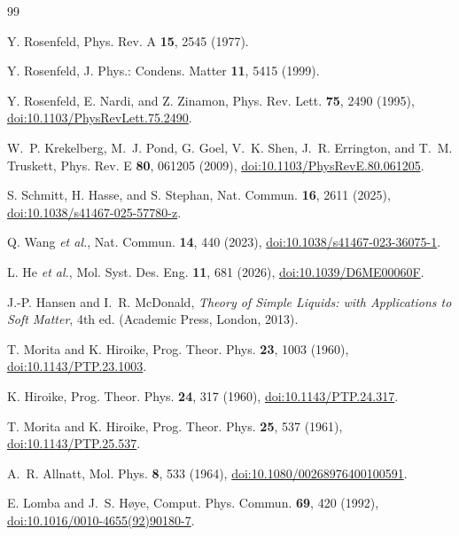 \documentclass[aps,pre,twocolumn,superscriptaddress,floatfix]{revtex4-2}
\begin{document}
\begin{thebibliography}{99}

Y. Rosenfeld,
Phys. Rev. A \textbf{15}, 2545 (1977).

Y. Rosenfeld,
J. Phys.: Condens. Matter \textbf{11}, 5415 (1999).

Y. Rosenfeld, E. Nardi, and Z. Zinamon,
Phys. Rev. Lett. \textbf{75}, 2490 (1995),
\href{https://doi.org/10.1103/PhysRevLett.75.2490}{doi:10.1103/PhysRevLett.75.2490}.

W.~P. Krekelberg, M.~J. Pond, G. Goel, V.~K. Shen, J.~R. Errington, and T.~M. Truskett,
Phys. Rev. E \textbf{80}, 061205 (2009),
\href{https://doi.org/10.1103/PhysRevE.80.061205}{doi:10.1103/PhysRevE.80.061205}.

S. Schmitt, H. Hasse, and S. Stephan,
Nat. Commun. \textbf{16}, 2611 (2025),
\href{https://doi.org/10.1038/s41467-025-57780-z}{doi:10.1038/s41467-025-57780-z}.

Q. Wang \textit{et al.},
Nat. Commun. \textbf{14}, 440 (2023),
\href{https://doi.org/10.1038/s41467-023-36075-1}{doi:10.1038/s41467-023-36075-1}.

L. He \textit{et al.},
Mol. Syst. Des. Eng. \textbf{11}, 681 (2026),
\href{https://doi.org/10.1039/D6ME00060F}{doi:10.1039/D6ME00060F}.

J.-P. Hansen and I.~R. McDonald,
\textit{Theory of Simple Liquids: with Applications to Soft Matter}, 4th ed.
(Academic Press, London, 2013).

T. Morita and K. Hiroike,
Prog. Theor. Phys. \textbf{23}, 1003 (1960),
\href{https://doi.org/10.1143/PTP.23.1003}{doi:10.1143/PTP.23.1003}.

K. Hiroike,
Prog. Theor. Phys. \textbf{24}, 317 (1960),
\href{https://doi.org/10.1143/PTP.24.317}{doi:10.1143/PTP.24.317}.

T. Morita and K. Hiroike,
Prog. Theor. Phys. \textbf{25}, 537 (1961),
\href{https://doi.org/10.1143/PTP.25.537}{doi:10.1143/PTP.25.537}.

A.~R. Allnatt,
Mol. Phys. \textbf{8}, 533 (1964),
\href{https://doi.org/10.1080/00268976400100591}{doi:10.1080/00268976400100591}.

E. Lomba and J.~S. H{\o}ye,
Comput. Phys. Commun. \textbf{69}, 420 (1992),
\href{https://doi.org/10.1016/0010-4655(92)90180-7}{doi:10.1016/0010-4655(92)90180-7}.


\end{thebibliography}
\end{document}
